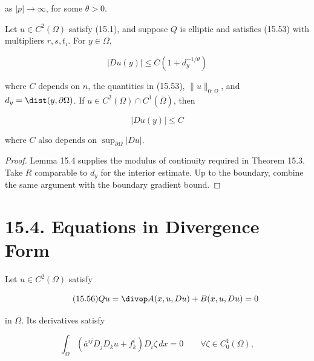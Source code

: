 as \(|p|\to\infty\), for some \(\theta>0\).

\begin{theorem}\label{gilbarg-trudinger.thm.15.5.natural-growth-gradient-bounds}
Let $u\in C^2(\Omega)$ satisfy (15.1), and suppose $Q$ is elliptic and satisfies
(15.53) with multipliers $r,s,t_i$. For $y\in\Omega$,

\begin{equation}\tag{15.54}
|Du(y)| \leq C\left(1 + d_y^{-1/\theta}\right)
\end{equation}

where $C$ depends on $n$, the quantities in (15.53), $\|u\|_{0;\Omega}$, and
$d_y=\dist(y,\partial\Omega)$. If $u\in C^2(\Omega)\cap C^1(\bar\Omega)$, then

\begin{equation}\tag{15.55}
|Du(y)| \leq C
\end{equation}

where $C$ also depends on $\sup_{\partial\Omega}|Du|$.
\end{theorem}
\begin{proof}
\sketch Lemma 15.4 supplies the modulus of continuity required in Theorem 15.3.
Take $R$ comparable to $d_y$ for the interior estimate. Up to the boundary, combine
the same argument with the boundary gradient bound.
\end{proof}

\bigskip

\section*{15.4. Equations in Divergence Form}

Let \(u\in C^2(\Omega)\) satisfy

\begin{equation}\tag{15.56}
Qu = \divop A(x,u,Du) + B(x,u,Du) = 0
\end{equation}

in \(\Omega\). Its derivatives satisfy

\begin{equation}\tag{15.57}
\int_\Omega \left(\bar a^{ij}D_jD_k u + f_k^i\right)D_i\zeta\,dx = 0 \qquad \forall \zeta \in C_0^1(\Omega),
\end{equation}




